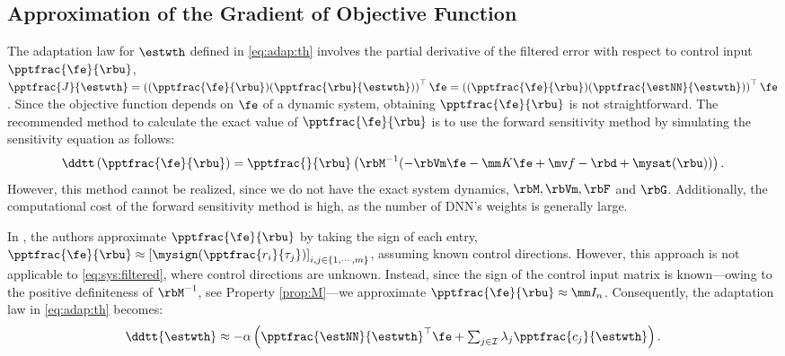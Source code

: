 \documentclass[letterpaper, journal]{IEEEtran}
\begin{document}
\subsection{Approximation of the Gradient of Objective Function}

The adaptation law for $\estwth$ defined in \eqref{eq:adap:th} involves the partial derivative of the filtered error with respect to control input $\pptfrac{\fe}{\rbu}$, \ie 
$
    \pptfrac{J}{\estwth}
    =
    \left(
        (\pptfrac{\fe}{\rbu})
        (\pptfrac{\rbu}{\estwth})
    \right)
    ^\top \fe
    =
    \left(
        (\pptfrac{\fe}{\rbu})
        (\pptfrac{\estNN}{\estwth})
    \right)
    ^\top \fe
$. 
Since the objective function depends on $\fe$ of a dynamic system, obtaining $\pptfrac{\fe}{\rbu}$ is not straightforward. 
The recommended method to calculate the exact value of $\pptfrac{\fe}{\rbu}$ is to use the forward sensitivity method \cite{Sengupta:2014aa,Ryu:2024aa} by simulating the sensitivity equation as follows: 
\begin{equation}
    \ddtt 
    \left(
        \pptfrac{\fe}{\rbu}
    \right)
    =
    \pptfrac{}{
        \rbu
    }
    \left(
        \rbM^{-1}(
            -\rbVm \fe
            -\mm K \fe
            + \mv f
            -\rbd + \mysat(\rbu)
        )
    \right)
    .
\end{equation}
However, this method cannot be realized, since we do not have the exact system dynamics, \ie $\rbM,\rbVm, \rbF$ and $ \rbG$.
Additionally, the computational cost of the forward sensitivity method is high, as the number of DNN's weights is generally large.

In \cite{Douratsos:2007aa,Saerens:1991aa}, the authors approximate $\pptfrac{\fe}{\rbu}$ by taking the sign of each entry, \ie
$
    \pptfrac{\fe}{\rbu}
    \approx
    \left[
        \mysign(\pptfrac{r_i}{\tau_j})
    \right]_{i,j\in\{1,\cdots,m\}}
$, 
assuming known control directions.
However, this approach is not applicable to \eqref{eq:sys:filtered}, where control directions are unknown.
Instead, since the sign of the control input matrix is known—owing to the positive definiteness of $\rbM^{-1}$, see Property \ref{prop:M}—we approximate $\pptfrac{\fe}{\rbu}\approx \mm I_n$.
Consequently, the adaptation law in \eqref{eq:adap:th} becomes:
\begin{equation}
    \ddtt{\estwth}
    \approx
    -\alpha 
    \left(
        \pptfrac{\estNN}
        {\estwth}^\top
        \fe
        +
        \textstyle\sum_{j\in\mathcal{I}}
        \lambda_j 
        \pptfrac{c_j}{\estwth}
    \right)
    .
    \label{eq:adap:th:approx}
\end{equation}
\end{document}
